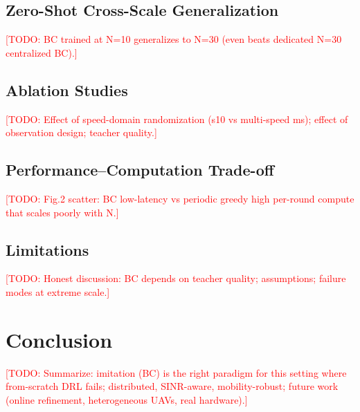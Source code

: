 \documentclass[journal]{IEEEtran}
\newcommand{\todo}[1]{\textcolor{red}{[TODO: #1]}}
\begin{document}
\subsection{Zero-Shot Cross-Scale Generalization}
\todo{BC trained at N=10 generalizes to N=30 (even beats dedicated N=30
centralized BC).}

\subsection{Ablation Studies}
\todo{Effect of speed-domain randomization (s10 vs multi-speed ms); effect of
observation design; teacher quality.}

\subsection{Performance--Computation Trade-off}
\todo{Fig.2 scatter: BC low-latency vs periodic greedy high per-round compute
that scales poorly with N.}

\subsection{Limitations}
\todo{Honest discussion: BC depends on teacher quality; assumptions; failure
modes at extreme scale.}

\section{Conclusion}
\label{sec:conclusion}
\todo{Summarize: imitation (BC) is the right paradigm for this setting where
from-scratch DRL fails; distributed, SINR-aware, mobility-robust; future work
(online refinement, heterogeneous UAVs, real hardware).}



\end{document}

